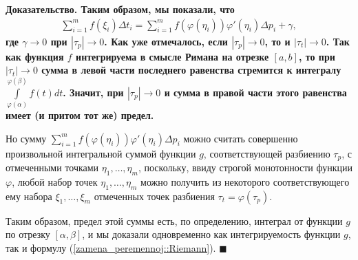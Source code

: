 \documentclass{report}
\newcounter{rem}[section]
\newenvironment{Proof}{\par\noindent\bf Доказательство.\rm}{ $\blacksquare$\par}
\begin{document}
\begin{Proof}
Таким образом, мы показали, что
\begin{gather*}
\sum\limits_{i=1}^mf(\xi_i)\Delta t_i=\sum\limits_{i=1}^mf(\varphi(\eta_i))\varphi'(\eta_i)\Delta p_i+\gamma,
\end{gather*}
где $\gamma\to0$ при $|\tau_p|\to0$. Как уже отмечалось, если $|\tau_p|\to0$, то и $|\tau_t|\to0$. Так как функция $f$ интегрируема в смысле Римана на отрезке $[a,b]$, то при
$|\tau_t|\to0$ сумма в левой части последнего равенства стремится к интегралу $\int\limits_{\varphi(\alpha)}^{\varphi(\beta)}f(t)dt$. Значит, при $|\tau_p|\to0$ и сумма в правой части
этого равенства имеет (и притом тот же) предел.

Но сумму $\sum\limits_{i=1}^mf(\varphi(\eta_i))\varphi'(\eta_i)\Delta p_i$ можно считать совершенно произвольной интегральной суммой функции $g$, соответствующей разбиению $\tau_p$, с
отмеченными точками $\eta_1,\dots,\eta_m$, поскольку, ввиду строгой монотонности функции $\varphi$, любой набор точек $\eta_1,\dots,\eta_m$ можно получить из некоторого соответствующего
ему набора $\xi_1,\dots,\xi_m$ отмеченных точек разбиения $\tau_t=\varphi(\tau_p)$.

Таким образом, предел этой суммы есть, по определению, интеграл от функции $g$ по отрезку $[\alpha,\beta]$, и мы доказали одновременно как
интегрируемость функции $g$, так и формулу (\ref{zamena_peremennoj::Riemann}).
\end{Proof}
\end{document}
